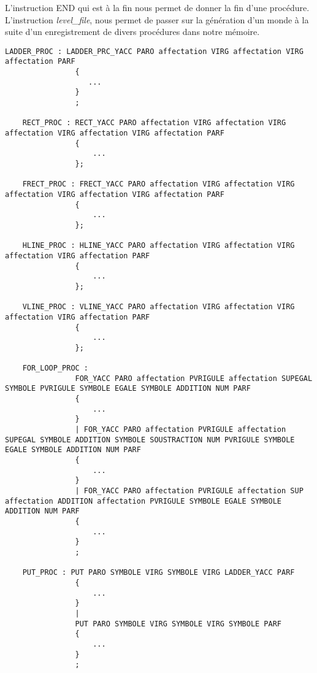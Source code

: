 L'instruction END qui est à la fin nous permet de donner la fin d'une procédure.
L'instruction \textit{level\_file}, nous permet de passer sur la génération d'un monde à la suite d'un enregistrement de divers procédures dans notre mémoire.

\lstset{style=mystyle}
\begin{lstlisting}[caption=Régle de grammaire pour les différentes procédures]
LADDER_PROC : LADDER_PRC_YACC PARO affectation VIRG affectation VIRG affectation PARF 
                {
                   ...
                }
                ;

    RECT_PROC : RECT_YACC PARO affectation VIRG affectation VIRG affectation VIRG affectation VIRG affectation PARF 
                {
                    ...
                };

    FRECT_PROC : FRECT_YACC PARO affectation VIRG affectation VIRG affectation VIRG affectation VIRG affectation PARF 
                {
                    ...
                };

    HLINE_PROC : HLINE_YACC PARO affectation VIRG affectation VIRG affectation VIRG affectation PARF 
                {
                    ...
                };

    VLINE_PROC : VLINE_YACC PARO affectation VIRG affectation VIRG affectation VIRG affectation PARF 
                {
                    ...
                };

    FOR_LOOP_PROC : 
                FOR_YACC PARO affectation PVRIGULE affectation SUPEGAL SYMBOLE PVRIGULE SYMBOLE EGALE SYMBOLE ADDITION NUM PARF
                {
                    ...
                }
                | FOR_YACC PARO affectation PVRIGULE affectation SUPEGAL SYMBOLE ADDITION SYMBOLE SOUSTRACTION NUM PVRIGULE SYMBOLE EGALE SYMBOLE ADDITION NUM PARF
                {
                    ...
                }
                | FOR_YACC PARO affectation PVRIGULE affectation SUP affectation ADDITION affectation PVRIGULE SYMBOLE EGALE SYMBOLE ADDITION NUM PARF
                {
                    ...
                }
                ;

    PUT_PROC : PUT PARO SYMBOLE VIRG SYMBOLE VIRG LADDER_YACC PARF  
                {
                    ...
                }
                |
                PUT PARO SYMBOLE VIRG SYMBOLE VIRG SYMBOLE PARF  
                {
                    ...
                }
                ;

\end{lstlisting}

